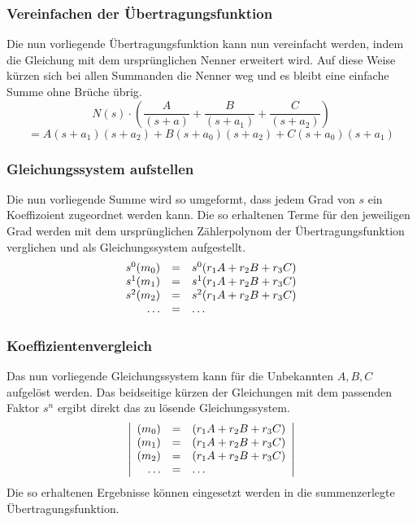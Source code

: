 \subsubsection{Vereinfachen der Übertragungsfunktion}
Die nun vorliegende Übertragungsfunktion kann nun vereinfacht werden, indem
die Gleichung mit dem ursprünglichen Nenner erweitert wird. Auf diese
Weise kürzen sich bei allen Summanden die Nenner weg und es bleibt eine
einfache Summe ohne Brüche übrig.
\[  
    N(s) \cdot \left( 
        \frac{A}{(s+a)} 
        + \frac{B}{(s+a_1)} 
        + \frac{C}{(s+a_2)} 
    \right) 
\]
%
\[
    = A(s+a_1)(s+a_2) + B(s+a_0)(s+a_2) + C(s+a_0)(s+a_1)
\]

\subsubsection{Gleichungssystem aufstellen}
Die nun vorliegende Summe wird so umgeformt, dass jedem Grad von $s$ ein
Koeffizoient zugeordnet werden kann. Die so erhaltenen Terme für den
jeweiligen Grad werden mit dem ursprünglichen Zählerpolynom der 
Übertragungsfunktion verglichen und als Gleichungssystem aufgestellt.
\[ 
    \begin{array}{r c l}  
        s^0(m_0) & = & s^0(r_1 A + r_2 B + r_3 C) \\
        s^1(m_1) & = & s^1(r_1 A + r_2 B + r_3 C) \\
        s^2(m_2) & = & s^2(r_1 A + r_2 B + r_3 C) \\
        \dots   & = & \dots
    \end{array}
\]


\subsubsection{Koeffizientenvergleich}
Das nun vorliegende Gleichungssystem kann für die Unbekannten $A,B,C$ 
aufgelöst werden. Das beidseitige kürzen der Gleichungen mit dem 
passenden Faktor $s^n$ ergibt direkt das zu lösende Gleichungssystem. 
\[  
    \left\lvert \begin{array}{r c l}
        (m_0) & = & (r_1 A + r_2 B + r_3 C) \\
        (m_1) & = & (r_1 A + r_2 B + r_3 C) \\
        (m_2) & = & (r_1 A + r_2 B + r_3 C) \\
        \dots   & = & \dots 
    \end{array} \right\rvert
\]
Die so erhaltenen Ergebnisse können eingesetzt werden in die 
summenzerlegte Übertragungsfunktion.
